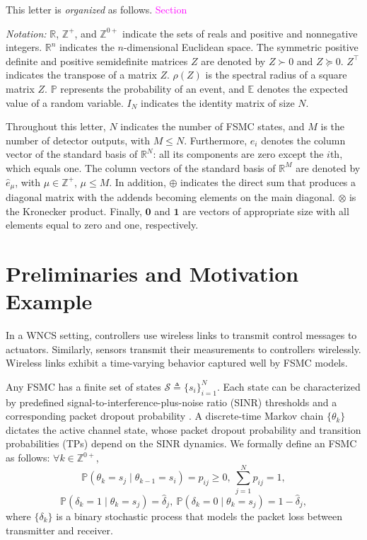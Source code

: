 \documentclass[journal,twoside,web]{ieeecolor}
\begin{document}
This letter is \emph{organized} as follows. 
\textcolor{magenta}{Section}

\textit{Notation:} $\mathbb{R}$, $\mathbb{Z}^{+}$, and $\mathbb{Z}^{0+}$ indicate the sets of reals and positive and nonnegative integers. $\mathbb{R}^{n}$ indicates the $n$-dimensional Euclidean space. The symmetric positive definite and positive semidefinite matrices $Z$ are denoted by $Z\succ 0$ and $Z\succeq 0$. $Z^{\top}$ indicates the transpose of a matrix $Z$. $\rho(Z)$ is the spectral radius of a square matrix $Z$. 
$\mathbb{P}$ represents the probability of an event, and $\mathbb{E}$ denotes the expected value of a random variable. $I_N$ indicates the identity matrix of size $N$. 

Throughout this letter, $N$ indicates the number of FSMC states, and $M$ is the number of detector outputs, with $M\leq N$.
Furthermore, $e_i$ denotes the column vector of the standard basis of $\mathbb{R}^{N}$: all its components are zero except the $i$th, which equals one. The column vectors of the standard basis of $\mathbb{R}^{M}$ are denoted by $\hat{e}_{\mu}$, with $\mu\in\mathbb{Z}^{+}$, $\mu\leq M$. In addition, $\oplus$ indicates the direct sum that produces a diagonal matrix with the addends becoming elements on the main diagonal. $\otimes$ is the Kronecker product. Finally, $\mathbf{0}$ and $\mathbf{1}$ are vectors of appropriate size with all elements equal to zero and one, respectively.

\section{Preliminaries and Motivation Example}\label{sec:prelim}
In a WNCS setting, controllers use wireless links to transmit control messages to actuators. 
Similarly, sensors transmit their measurements to controllers wirelessly. Wireless links exhibit a time-varying behavior captured well by FSMC models. 

Any FSMC has a finite set of states $\mathcal{S}\triangleq\{s_i\}_{i=1}^{N}$. Each state can be characterized by predefined signal-to-interference-plus-noise ratio (SINR) thresholds and a corresponding packet dropout probability \cite{zacchialun2024access}. A discrete-time Markov chain $\{\theta_k\}$ dictates the active channel state, whose packet dropout probability and transition probabilities (TPs) depend on the SINR dynamics. We formally define an FSMC as follows: $\forall k\in \mathbb{Z}^{0+}$,
\begin{equation}\label{eq:p-ij}
    \mathbb{P}(\theta_{k} = s_j \mid \theta_{k-1} = s_i) = p_{ij} \geq 0,~ \sum_{j=1}^N p_{ij} = 1,
\end{equation}
\begin{equation}\label{eq:p-delta}
    \mathbb{P}(\delta_k = 1 \mid \theta_{k} = s_j) = \hat{\delta}_{j},~
    \mathbb{P}(\delta_k = 0 \mid \theta_{k} = s_j) = 1 - \hat{\delta}_{j},
\end{equation}
where $\{\delta_k\}$ is a binary stochastic process that models the packet loss between transmitter and receiver.
\end{document}
